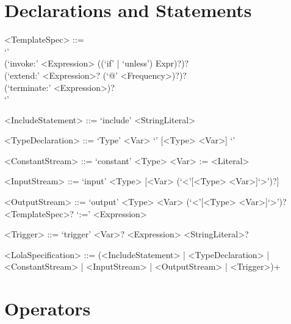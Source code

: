 \documentclass{scrartcl}
\begin{document}
    
  \section{Declarations and Statements}
  
  \begin{grammar}
  
  <TemplateSpec> ::= \ \\
      `{' \\
        (`invoke:' <Expression> ((`if' | `unless') Expr)?)? \\
        (`extend:' <Expression>? (`@' <Frequency>)?)? \\
        (`terminate:' <Expression>)? \\
      `}'
      
  <IncludeStatement> ::= `include' <StringLiteral>
  
  <TypeDeclaration> ::= `Type' <Var> `{' [<Type> <Var>] `}'
  
  <ConstantStream> ::= `constant' <Type> <Var> := <Literal>
  
  <InputStream> ::= `input' <Type> [<Var> (`<'[<Type> <Var>]`>')?]
  
  <OutputStream> ::= `output' <Type> <Var> (`<'[<Type> <Var>]`>')? <TemplateSpec>? `:=' <Expression>
  
  <Trigger> ::= `trigger' <Var>? <Expression> <StringLiteral>?
  
  <LolaSpecification> ::= (<IncludeStatement> | <TypeDeclaration> | <ConstantStream> | <InputStream> | <OutputStream> | <Trigger>)+
    
  \end{grammar}

  \section{Operators}
  
  \setcounter{prec}{1}
  
\end{document}
